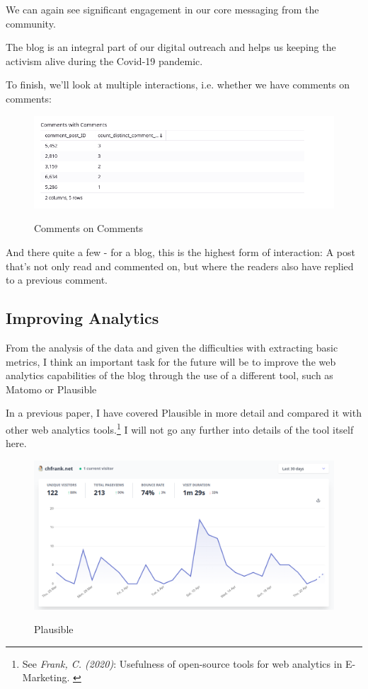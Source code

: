 We can again see significant engagement in our core messaging from the community. 

The blog is an integral part of our digital outreach and helps us keeping the activism alive during the Covid-19 pandemic.

To finish, we'll look at multiple interactions, i.e. whether we have comments on comments:

\begin{figure}[H]
\centering
\caption {Comments on Comments}
\includegraphics[width=\linewidth]{images/figure19.png}
\label{fig:commentsComment}
\end{figure}

And there quite a few - for a blog, this is the highest form of interaction: A post that's not only read and commented on, but where the readers also have replied to a previous comment.

\subsection{Improving Analytics}

From the analysis of the data and given the difficulties with extracting basic metrics, I think an important task for the future will be to improve the web analytics capabilities of the blog through the use of a different tool, such as Matomo or Plausible

In a previous paper, I have covered Plausible in more detail and compared it with other web analytics tools.\footnote{See \textit{Frank, C. (2020)}: Usefulness of open-source tools for web analytics in E-Marketing. \cite{previousPaper}} I will not go any further into details of the tool itself here.

\begin{figure}[H]
\centering
\caption {Plausible}
\includegraphics[width=\linewidth]{images/plausible.png}
\label{fig:plausible}
\end{figure}

